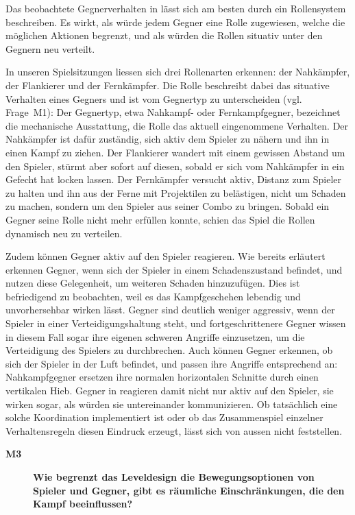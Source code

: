 \documentclass[../Main.tex]{subfiles}
\begin{document}
Das beobachtete Gegnerverhalten in  lässt sich am besten durch ein Rollensystem beschreiben. Es wirkt, als würde jedem Gegner eine Rolle zugewiesen, welche die möglichen Aktionen begrenzt, und als würden die Rollen situativ unter den Gegnern neu verteilt.

In unseren Spielsitzungen liessen sich drei Rollenarten erkennen: der Nahkämpfer, der Flankierer und der Fernkämpfer. Die Rolle beschreibt dabei das situative Verhalten eines Gegners und ist vom Gegnertyp zu unterscheiden (vgl. Frage~M1): Der Gegnertyp, etwa Nahkampf- oder Fernkampfgegner, bezeichnet die mechanische Ausstattung, die Rolle das aktuell eingenommene Verhalten. Der Nahkämpfer ist dafür zuständig, sich aktiv dem Spieler zu nähern und ihn in einen Kampf zu ziehen. Der Flankierer wandert mit einem gewissen Abstand um den Spieler, stürmt aber sofort auf diesen, sobald er sich vom Nahkämpfer in ein Gefecht hat locken lassen. Der Fernkämpfer versucht aktiv, Distanz zum Spieler zu halten und ihn aus der Ferne mit Projektilen zu belästigen, nicht um Schaden zu machen, sondern um den Spieler aus seiner Combo zu bringen. Sobald ein Gegner seine Rolle nicht mehr erfüllen konnte, schien das Spiel die Rollen dynamisch neu zu verteilen.

Zudem können Gegner aktiv auf den Spieler reagieren. Wie bereits erläutert erkennen Gegner, wenn sich der Spieler in einem Schadenszustand befindet, und nutzen diese Gelegenheit, um weiteren Schaden hinzuzufügen. Dies ist befriedigend zu beobachten, weil es das Kampfgeschehen lebendig und unvorhersehbar wirken lässt. Gegner sind deutlich weniger aggressiv, wenn der Spieler in einer Verteidigungshaltung steht, und fortgeschrittenere Gegner wissen in diesem Fall sogar ihre eigenen schweren Angriffe einzusetzen, um die Verteidigung des Spielers zu durchbrechen. Auch können Gegner erkennen, ob sich der Spieler in der Luft befindet, und passen ihre Angriffe entsprechend an: Nahkampfgegner ersetzen ihre normalen horizontalen Schnitte durch einen vertikalen Hieb. Gegner in  reagieren damit nicht nur aktiv auf den Spieler, sie wirken sogar, als würden sie untereinander kommunizieren. Ob tatsächlich eine solche Koordination implementiert ist oder ob das Zusammenspiel einzelner Verhaltensregeln diesen Eindruck erzeugt, lässt sich von aussen nicht feststellen.

\begin{description}
  \item[\textbf{M3}] \textbf{Wie begrenzt das Leveldesign die Bewegungsoptionen von Spieler und Gegner, gibt es räumliche Einschränkungen, die den Kampf beeinflussen?}
\end{description}
\end{document}
